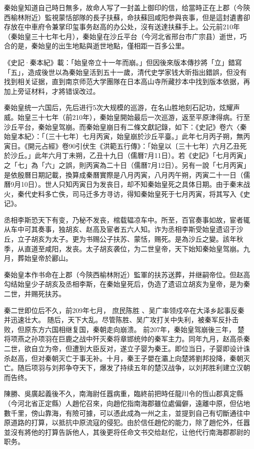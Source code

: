 秦始皇知道自己時日無多，故命人写了一封盖上御印的信，给當時正在上郡（今陝西榆林附近）監視蒙恬部隊的長子扶蘇，命扶蘇回咸阳参與丧事，但是這封遺書卻存放在中車府令兼掌印玺事务赵高的办公处，沒有送達扶蘇手上。公元前210年（秦始皇三十七年七月），秦始皇在沙丘平台（今河北省邢台市广宗县）逝世，巧合的是，秦始皇的出生地點與逝世地點，僅相距一百多公里。

《史記·秦本紀》載：「始皇帝立十一年而崩。」但因後來版本傳抄將「立」錯寫「五」，造成後世以為秦始皇活到五十一歲，清代史学家钱大昕指出錯誤，但没有找到相关证据，直到南京师范大学團隊在日本高山寺所藏抄本中找到版本依据，再加上旁证材料，才將错误改过。

秦始皇统一六国后，先后进行5次大规模的巡游，在名山胜地刻石記功，炫耀声威。始皇三十七年（前210年），秦始皇開始最后一次巡游，返至平原津得病。行至沙丘平台，秦始皇驾崩。而秦始皇崩日有二條文獻記錄，如下：《史記》卷六〈秦始皇本紀〉：「〔三十七年〕七月丙寅，始皇崩於沙丘平臺。」此年七月丙子朔，無丙寅日。《開元占經》卷90引伏生《洪範五行傳》：「始皇以〔三十七年〕六月乙丑死於沙丘。」此年六月丁未朔，乙丑十九日（儒曆7月11日）。若《史記》「七月丙寅」之「七」為「六」之誤，則丙寅為二十日（儒曆7月12日）。另有一說「七月丙寅」是依殷曆日期記載，換算成秦曆實際是八月丙寅，八月丙午朔，丙寅二十一日（儒曆9月10日）。世人只知丙寅日为发丧日，却不知秦始皇死之具体日期。由于秦末战火，秦代史料多亡佚，司马迁多方寻访，得知秦始皇死于七月丙寅，将其写入《史记》。

丞相李斯恐天下有变，乃秘不发丧，棺载辒凉车中。所至，百官奏事如故，宦者辄从车中可其奏事，独胡亥、赵高及宦者五六人知。诈为丞相李斯受始皇遗诏于沙丘，立子胡亥为太子。更为书赐公子扶苏、蒙恬，赐死。是為沙丘之變。該年秋季，从直道至咸阳，发丧。太子胡亥袭位，为二世皇帝，天下始知秦始皇驾崩。九月，葬始皇帝於酈山。

秦始皇本作书命在上郡（今陝西榆林附近）監軍的扶苏送葬，并继嗣帝位。但赵高勾结始皇少子胡亥及丞相李斯，在秦始皇死后，伪造了遗诏立胡亥为皇帝，是为秦二世，并赐死扶苏。

秦二世即位后不久，前209年七月， 庶民陈胜 、吴广率领戍卒在大泽乡起事反秦并迅速壮大。 随后，天下大乱。尽管陈胜、吴广攻打关中失利，被秦军反扑击败，但原东方六国相继复国，秦朝走向崩溃。 前207年，秦始皇驾崩後三年， 楚将项燕之孙项羽在巨鹿之战中歼灭秦将章邯统帅的秦军主力。同年九月，赵高杀秦二世，欲自立为帝，但遭到大臣反对，遂立子婴为秦王。即位当日，子婴即设计诛杀赵高，但对秦朝灭亡于事无补。十月，秦王子嬰在灞上向楚將劉邦投降，秦朝灭亡。随后项羽与刘邦争夺天下，爆发了持续五年的楚汉战争，以刘邦胜利建立汉朝而告终。

陳勝、吳廣起義後不久，南海尉任囂病重，臨終前把時任龍川令的恆山郡真定縣（今河北省正定縣）人趙佗召來，向趙佗指南海郡雖位處偏僻，遠離中原，但佔地數千里，傍山靠海，有險可據，可以憑此成為一州之主，並提到自己有切斷通往中原道路的打算，以抵抗中原流寇的侵犯。由於信任趙佗的能力，除了趙佗外，任囂並沒有將他的打算告訴他人，其後更将任命文书交给赵佗，让他代行南海郡郡尉的职务。

